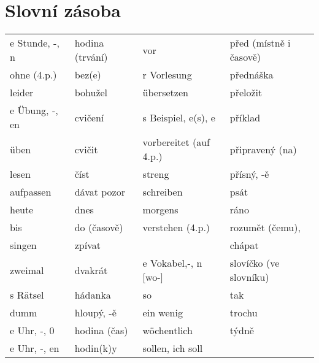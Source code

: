   \section*{Slovní zásoba}
    \begin{table}[ht!]   %
      \centering
      \begin{tabular}{llll}
        \hline
          e Stunde, -, n       & hodina {\scriptsize (trvání)}         & vor            
                                                    & před {\scriptsize (místně i časově)}        \\
          ohne (4.p.)          & bez(e)             & r Vorlesung      & přednáška                \\
          leider               & bohužel            & übersetzen       & přeložit                 \\
          e Übung, -, en       & cvičení   & s Beispiel, e(s), e       & příklad                  \\
          üben                 & cvičit    & vorbereitet (auf 4.p.)    & připravený (na)          \\
          lesen                & číst               & streng           & přísný, -ě               \\
          aufpassen            & dávat pozor        & schreiben        & psát                     \\
          heute                & dnes               & morgens          & ráno                     \\
          bis                  & do {\scriptsize (časově)}
                                                    & verstehen (4.p.) & rozumět (čemu),          \\
          singen               & zpívat             &                  & chápat                   \\
          zweimal              & dvakrát            & e Vokabel,-, n [wo-]  
                                                    & slovíčko {\scriptsize (ve slovníku)}        \\
          s Rätsel             & hádanka            & so               & tak                      \\
          dumm                 & hloupý, -ě         & ein wenig        & trochu                   \\
          e Uhr, -, 0          & hodina (čas)       & wöchentlich      & týdně                    \\
          e Uhr, -, en         & hodin(k)y          & sollen, ich soll 

\end{tabular}
\end{table}
